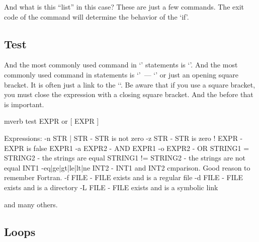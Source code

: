 And what is this ``list'' in this case? These are just a few commands.
The exit code of the command will determine the behavior of the `if'.

\subsection*{Test} %

And the most commonly used command in `' statements is `'.
And the most commonly used command in statements is `'~---
`' or just an opening square bracket. It is often just a link to
the  ``. Be aware that if you use a square bracket,
you must close the expression with a closing square bracket.
And the  before that is important.
\begin{code}{mverb}
test EXPR or [ EXPR ]

Expressions:
-n STR | STR - STR is not zero
-z STR - STR is zero
! EXPR - EXPR is false
EXPR1 -a EXPR2 - AND
EXPR1 -o EXPR2 - OR
STRING1 = STRING2  - the strings are equal
STRING1 != STRING2 - the strings are not equal
INT1 -eq|ge|gt|le|lt|ne INT2 - INT1 and INT2 cmparison. Good reason to remember Fortran.
-f FILE - FILE exists and is a regular file
-d FILE - FILE exists and is a directory
-L FILE - FILE exists and is a symbolic link
\end{code}
and many others.

\subsection{Loops} %

